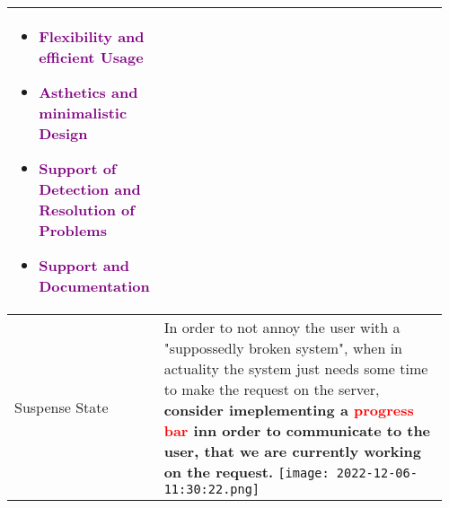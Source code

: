 \documentclass[main.tex,fontsize=8pt,paper=a4,paper=portrait,DIV=calc,]{scrartcl}
\begin{document}
\begin{table}[ht!]
\begin{tabular}{|m{0.2\linewidth}|m{0.755\linewidth}|}
\begin{itemize}
\item \textcolor{purple}{Flexibility and efficient Usage}
\item \textcolor{purple}{Asthetics and minimalistic Design}
\item \textcolor{purple}{Support of Detection and Resolution of Problems}
\item \textcolor{purple}{Support and Documentation}
\vspace{-3mm}
\end{itemize} \\
\hline
Suspense State & 
In order to not annoy the user with a "suppossedly broken system", when in actuality the system just needs some time to make the request on the server, \textbf{consider imeplementing a \textcolor{red}{progress bar} inn order to communicate to the user, that we are currently working on the request.}\newline
\texttt{[image: 2022-12-06-11:30:22.png]}\\
\hline
\end{tabular}
\end{table}
\pagebreak
\end{document}

